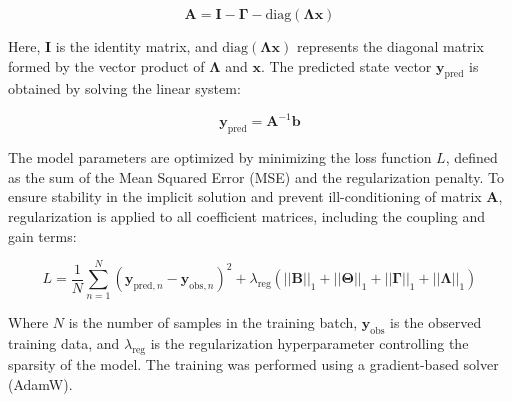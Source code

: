 \documentclass{article}
\begin{document}
\begin{equation}
\mathbf{A} = \mathbf{I} - \mathbf{\Gamma} - \text{diag}(\mathbf{\Lambda} \mathbf{x})
\end{equation}

Here, $\mathbf{I}$ is the identity matrix, and $\text{diag}(\mathbf{\Lambda} \mathbf{x})$ represents the diagonal matrix formed by the vector product of $\mathbf{\Lambda}$ and $\mathbf{x}$. The predicted state vector $\mathbf{y}_{\text{pred}}$ is obtained by solving the linear system:

\begin{equation}
\mathbf{y}_{\text{pred}} = \mathbf{A}^{-1} \mathbf{b}
\end{equation}

The model parameters are optimized by minimizing the loss function $L$, defined as the sum of the Mean Squared Error (MSE) and the regularization penalty. To ensure stability in the implicit solution and prevent ill-conditioning of matrix $\mathbf{A}$, regularization is applied to all coefficient matrices, including the coupling and gain terms:

\begin{equation}
L = \frac{1}{N} \sum_{n=1}^{N} (\mathbf{y}_{\text{pred}, n} - \mathbf{y}_{\text{obs}, n})^{2} + \lambda_{\text{reg}} (||\mathbf{B}||_{1} + ||\mathbf{\Theta}||_{1} + ||\mathbf{\Gamma}||_{1} + ||\mathbf{\Lambda}||_{1})
\end{equation}

Where $N$ is the number of samples in the training batch, $\mathbf{y}_{\text{obs}}$ is the observed training data, and $\lambda_{\text{reg}}$ is the regularization hyperparameter controlling the sparsity of the model. The training was performed using a gradient-based solver (AdamW).
\end{document}
